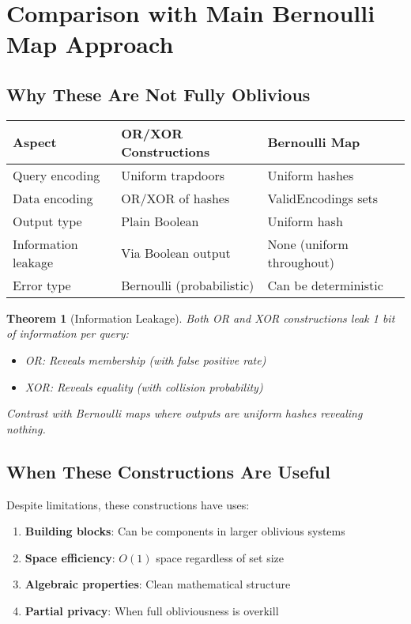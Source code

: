 \documentclass[11pt,final]{article}
\newtheorem{theorem}{Theorem}[section]
\begin{document}
\section{Comparison with Main Bernoulli Map Approach}

\subsection{Why These Are Not Fully Oblivious}

\begin{center}
\begin{tabular}{lll}
\toprule
\textbf{Aspect} & \textbf{OR/XOR Constructions} & \textbf{Bernoulli Map} \\
\midrule
Query encoding & Uniform trapdoors & Uniform hashes \\
Data encoding & OR/XOR of hashes & ValidEncodings sets \\
Output type & Plain Boolean & Uniform hash \\
Information leakage & Via Boolean output & None (uniform throughout) \\
Error type & Bernoulli (probabilistic) & Can be deterministic \\
\bottomrule
\end{tabular}
\end{center}

\begin{theorem}[Information Leakage]
Both OR and XOR constructions leak 1 bit of information per query:
\begin{itemize}
    \item OR: Reveals membership (with false positive rate)
    \item XOR: Reveals equality (with collision probability)
\end{itemize}
Contrast with Bernoulli maps where outputs are uniform hashes revealing nothing.
\end{theorem}

\subsection{When These Constructions Are Useful}

Despite limitations, these constructions have uses:
\begin{enumerate}
    \item \textbf{Building blocks}: Can be components in larger oblivious systems
    \item \textbf{Space efficiency}: $O(1)$ space regardless of set size  
    \item \textbf{Algebraic properties}: Clean mathematical structure
    \item \textbf{Partial privacy}: When full obliviousness is overkill
\end{enumerate}
\end{document}
